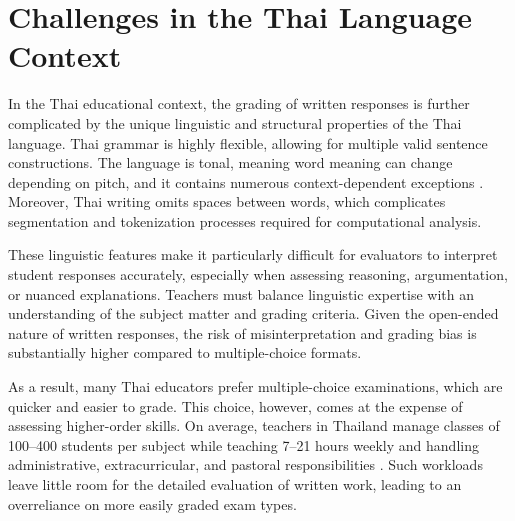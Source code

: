 
\section{Challenges in the Thai Language Context}

In the Thai educational context, the grading of written responses is further 
complicated by the unique linguistic and structural properties of the Thai 
language. Thai grammar is highly flexible, allowing for multiple valid 
sentence constructions. The language is tonal, meaning word meaning can 
change depending on pitch, and it contains numerous context-dependent 
exceptions \citep{Tongsilp2024}. Moreover, Thai writing omits spaces between words, which 
complicates segmentation and tokenization processes required for 
computational analysis.

These linguistic features make it particularly difficult for evaluators to 
interpret student responses accurately, especially when assessing reasoning, 
argumentation, or nuanced explanations. Teachers must balance linguistic 
expertise with an understanding of the subject matter and grading criteria. 
Given the open-ended nature of written responses, the risk of 
misinterpretation and grading bias is substantially higher compared to 
multiple-choice formats.

As a result, many Thai educators prefer multiple-choice examinations, which 
are quicker and easier to grade. This choice, however, comes at the expense 
of assessing higher-order skills. On average, teachers in Thailand manage 
classes of 100–400 students per subject while teaching 7–21 hours weekly 
and handling administrative, extracurricular, and pastoral 
responsibilities \citep{Goksoy2014}. Such workloads leave little room for the detailed 
evaluation of written work, leading to an overreliance on more easily 
graded exam types.



